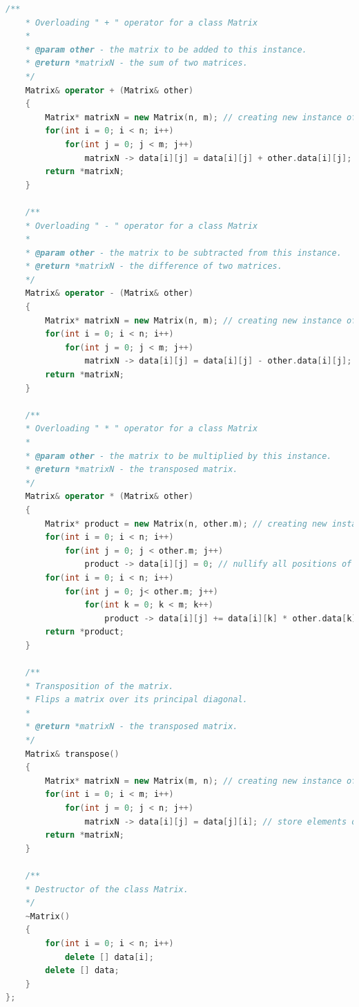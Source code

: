 \documentclass[11pt]{article}
\begin{document}
\begin{lstlisting}[language=C++, caption=Implementation of Least-squares approximation algorithm]
    /**
    * Overloading " + " operator for a class Matrix
    *
    * @param other - the matrix to be added to this instance.
    * @return *matrixN - the sum of two matrices.
    */
    Matrix& operator + (Matrix& other)
    {
        Matrix* matrixN = new Matrix(n, m); // creating new instance of the class Matrix to store the result
        for(int i = 0; i < n; i++)
            for(int j = 0; j < m; j++)
                matrixN -> data[i][j] = data[i][j] + other.data[i][j]; // store the result of an addition
        return *matrixN;
    }

    /**
    * Overloading " - " operator for a class Matrix
    *
    * @param other - the matrix to be subtracted from this instance.
    * @return *matrixN - the difference of two matrices.
    */
    Matrix& operator - (Matrix& other)
    {
        Matrix* matrixN = new Matrix(n, m); // creating new instance of the class Matrix to store the result
        for(int i = 0; i < n; i++)
            for(int j = 0; j < m; j++)
                matrixN -> data[i][j] = data[i][j] - other.data[i][j]; // store the result of a subtraction
        return *matrixN;
    }

    /**
    * Overloading " * " operator for a class Matrix
    *
    * @param other - the matrix to be multiplied by this instance.
    * @return *matrixN - the transposed matrix.
    */
    Matrix& operator * (Matrix& other)
    {
        Matrix* product = new Matrix(n, other.m); // creating new instance of the class Matrix to store the result
        for(int i = 0; i < n; i++)
            for(int j = 0; j < other.m; j++)
                product -> data[i][j] = 0; // nullify all positions of a new matrix
        for(int i = 0; i < n; i++)
            for(int j = 0; j< other.m; j++)
                for(int k = 0; k < m; k++)
                    product -> data[i][j] += data[i][k] * other.data[k][j]; // store the result of multiplication
        return *product;
    }

    /**
    * Transposition of the matrix.
    * Flips a matrix over its principal diagonal.
    *
    * @return *matrixN - the transposed matrix.
    */
    Matrix& transpose()
    {
        Matrix* matrixN = new Matrix(m, n); // creating new instance of the class Matrix to store the result
        for(int i = 0; i < m; i++)
            for(int j = 0; j < n; j++)
                matrixN -> data[i][j] = data[j][i]; // store elements of a particular row in the corresponding column
        return *matrixN;
    }

    /**
    * Destructor of the class Matrix.
    */
    ~Matrix()
    {
        for(int i = 0; i < n; i++)
            delete [] data[i];
        delete [] data;
    }
};


\end{lstlisting}
\end{document}
